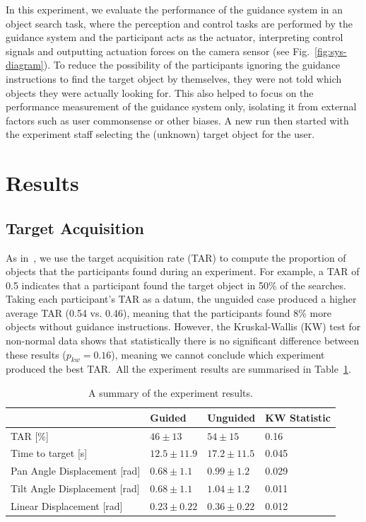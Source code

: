 \documentclass[runningheads]{llncs}
\begin{document}
In this experiment, we evaluate the performance of the guidance system in an object search task, where the perception and control tasks are performed by the guidance system and the participant acts as the actuator, interpreting control signals and outputting actuation forces on the camera sensor (see Fig.~\ref{fig:sys-diagram}). 
%
To reduce the possibility of the participants ignoring the guidance instructions to find the target object by themselves, they were not told which objects they were actually looking for.
This also helped to focus on the performance measurement of the guidance system only, isolating it from external factors such as user commonsense or other biases.
A new run then started with the experiment staff selecting the (unknown) target object for the user.

\section{Results}\label{sec:results}

\subsection{Target Acquisition}

As in~\cite{lock2019active}, we use the target acquisition rate (TAR) to compute the proportion of objects that the participants found during an experiment. 
For example, a TAR of 0.5 indicates that a participant found the target object in 50\% of the searches. 
Taking each participant's TAR as a datum, the unguided case produced a higher average TAR (0.54 vs. 0.46), meaning that the participants found 8\% more objects without guidance instructions.
However, the Kruskal-Wallis (KW) test for non-normal data shows that statistically there is no significant difference between these results ($p_{kw} = 0.16$), meaning we cannot conclude which experiment produced the best TAR.\
All the experiment results are summarised in Table~\ref{tab:results}. 

\begin{table}
  \centering
  \caption{A summary of the experiment results. }\label{tab:results}
  \begin{tabular}{p{5cm}p{2cm}p{2cm}p{2.5cm}}
    \toprule
    & \textbf{Guided}             & \textbf{Unguided} & \textbf{KW Statistic} \\\midrule
    TAR [\%]                      & $46\pm13$         & $54\pm15$     &  0.16 \\\midrule
    Time to target [s]            & $12.5\pm11.9$     & $17.2\pm11.5$ & 0.045 \\\midrule
    Pan Angle Displacement [rad]  & $0.68\pm1.1$      & $0.99\pm1.2$  & 0.029 \\\midrule
    Tilt Angle Displacement [rad] & $0.68\pm1.1$      & $1.04\pm1.2$  & 0.011 \\\midrule
    Linear Displacement [rad]     & $0.23\pm0.22$     & $0.36\pm0.22$ & 0.012 \\\midrule
    \bottomrule
  \end{tabular}
\end{table}
\end{document}
